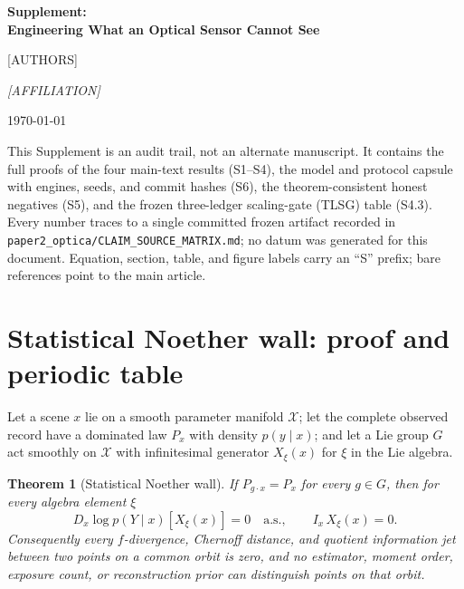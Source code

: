 \documentclass[10pt,onecolumn]{article}
\theoremstyle{plain}
\newtheorem{theorem}{Theorem}
\theoremstyle{definition}
\begin{document}
\begin{center}
{\LARGE\bfseries Supplement:\\[2pt]Engineering What an Optical Sensor Cannot See\par}
\vspace{8pt}
{\large [AUTHORS]\par}
\vspace{2pt}
{\itshape [AFFILIATION]\par}
\vspace{2pt}
{\small\today\par}
\end{center}

\vspace{6pt}
\noindent This Supplement is an audit trail, not an alternate manuscript. It
contains the full proofs of the four main-text results (S1--S4), the model and
protocol capsule with engines, seeds, and commit hashes (S6), the theorem-consistent
honest negatives (S5), and the frozen three-ledger scaling-gate (TLSG) table (S4.3).
Every number traces to a single committed frozen artifact recorded in
\texttt{paper2\_optica/CLAIM\_SOURCE\_MATRIX.md}; no datum was generated for this
document. Equation, section, table, and figure labels carry an ``S'' prefix; bare
references point to the main article.

\tableofcontents
\vspace{8pt}

\section{Statistical Noether wall: proof and periodic table}\label{sec:s1}
Let a scene $x$ lie on a smooth parameter manifold $\mathcal X$; let the complete
observed record have a dominated law $P_x$ with density $p(y\mid x)$; and let a Lie
group $G$ act smoothly on $\mathcal X$ with infinitesimal generator $X_\xi(x)$ for
$\xi$ in the Lie algebra.

\begin{theorem}[Statistical Noether wall]\label{thm:s-noether}
If $P_{g\cdot x}=P_x$ for every $g\in G$, then for every algebra element $\xi$
\begin{equation}
D_x\log p(Y\mid x)[X_\xi(x)]=0\quad\text{a.s.},\qquad
I_x\,X_\xi(x)=0.
\label{eq:s-scorenull}
\end{equation}
Consequently every $f$-divergence, Chernoff distance, and quotient information jet
between two points on a common orbit is zero, and no estimator, moment order,
exposure count, or reconstruction prior can distinguish points on that orbit.
\end{theorem}
\end{document}
